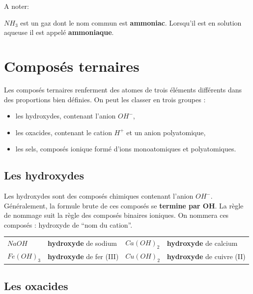 \documentclass[
  11pt,
  a4paper,
  openany]{book}
\providecommand{\tightlist}{%
  \setlength{\itemsep}{0pt}\setlength{\parskip}{0pt}}
\begin{document}
A noter:

\(NH_3\) est un gaz dont le nom commun est \textbf{ammoniac}. Lorsqu'il est en solution aqueuse il est appelé \textbf{ammoniaque}.

\section{Composés ternaires}\label{composuxe9s-ternaires}

Les composés ternaires renferment des atomes de trois éléments différents dans des proportions bien définies. On peut les classer en trois groupes :

\begin{itemize}
\tightlist
\item
  les hydroxydes, contenant l'anion \(OH^-\),
\item
  les oxacides, contenant le cation \(H^+\) et un anion polyatomique,
\item
  les sels, composés ionique formé d'ions monoatomiques et polyatomiques.
\end{itemize}

\subsection{Les hydroxydes}\label{les-hydroxydes}

Les hydroxydes sont des composés chimiques contenant l'anion \(OH^-\). Généralement, la formule brute de ces composés se \textbf{termine par OH}. La règle de nommage suit la règle des composés binaires ioniques. On nommera ces composés : hydroxyde de ``nom du cation''.

\begin{longtable}[]{@{}
  >{\centering\arraybackslash}p{}
  >{\raggedright\arraybackslash}p{}
  >{\centering\arraybackslash}p{}
  >{\raggedright\arraybackslash}p{}@{}}
\toprule\noalign{}
\endhead
\bottomrule\noalign{}
\endlastfoot
\(NaOH\) & \textbf{hydroxyde} de sodium & \(Ca(OH)_2\) & \textbf{hydroxyde} de calcium \\
\(Fe(OH)_3\) & \textbf{hydroxyde} de fer (III) & \(Cu(OH)_2\) & \textbf{hydroxyde} de cuivre (II) \\
\end{longtable}

\subsection{Les oxacides}\label{les-oxacides}
\end{document}

